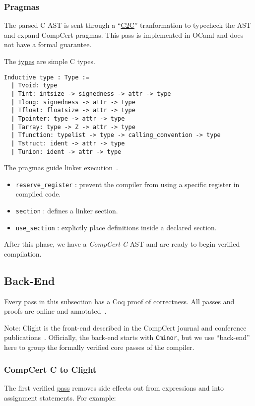 \subsubsection{Pragmas}

The parsed C AST is sent through a ``\href{https://github.com/AbsInt/CompCert/blob/master/cfrontend/C2C.ml}{C2C}'' tranformation to typecheck the AST and expand CompCert pragmas.
This pass is implemented in OCaml and does not have a formal guarantee.

The \href{https://github.com/AbsInt/CompCert/blob/master/cfrontend/Ctypes.v#L69}{types} are simple C types.
\begin{lstlisting}[style=Coq]
Inductive type : Type :=
  | Tvoid: type
  | Tint: intsize -> signedness -> attr -> type
  | Tlong: signedness -> attr -> type
  | Tfloat: floatsize -> attr -> type
  | Tpointer: type -> attr -> type
  | Tarray: type -> Z -> attr -> type
  | Tfunction: typelist -> type -> calling_convention -> type
  | Tstruct: ident -> attr -> type
  | Tunion: ident -> attr -> type
\end{lstlisting}

The pragmas guide linker execution~\cite{refman}.
\begin{itemize}
\item {\tt reserve\_register} : prevent the compiler from using a specific register in compiled code.
\item {\tt section} : defines a linker section.
\item {\tt use\_section} : explictly place definitions inside a declared section.
\end{itemize}

After this phase, we have a \emph{CompCert C} AST and are ready to begin verified compilation.


\subsection{Back-End}

Every pass in this subsection has a Coq proof of correctness.
All passes and proofs are online and annotated~\cite{src}.

Note: Clight is the front-end described in the CompCert journal and conference publications~\cite{bdl-formal,l-formal}.
Officially, the back-end starts with {\tt Cminor}, but we use ``back-end'' here to group the formally verified core passes of the compiler.


\subsubsection{CompCert C to Clight}
The first verified \href{https://github.com/AbsInt/CompCert/blob/master/cfrontend/SimplExpr.v}{pass} removes side effects out from expressions and into assignment statements.
For example:

